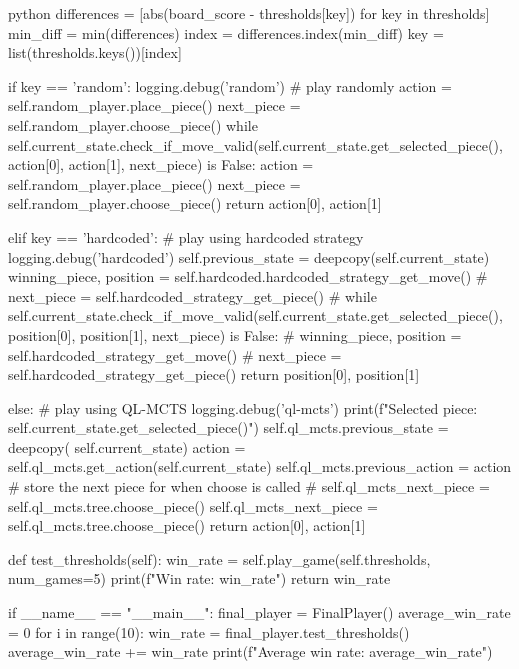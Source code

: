 \begin{mintedbox}{python}
            differences = [abs(board_score - thresholds[key])
                            for key in thresholds]
            min_diff = min(differences)
            index = differences.index(min_diff)
            key = list(thresholds.keys())[index]

            if key == 'random':
                logging.debug('random')
                # play randomly
                action = self.random_player.place_piece()
                next_piece = self.random_player.choose_piece()
                while self.current_state.check_if_move_valid(self.current_state.get_selected_piece(), action[0], action[1], next_piece) is False:
                    action = self.random_player.place_piece()
                    next_piece = self.random_player.choose_piece()
                return action[0], action[1]

            elif key == 'hardcoded':
                # play using hardcoded strategy
                logging.debug('hardcoded')
                self.previous_state = deepcopy(self.current_state)
                winning_piece, position = self.hardcoded.hardcoded_strategy_get_move()
                # next_piece = self.hardcoded_strategy_get_piece()
                # while self.current_state.check_if_move_valid(self.current_state.get_selected_piece(), position[0], position[1], next_piece) is False:
                #     winning_piece, position = self.hardcoded_strategy_get_move()
                #     next_piece = self.hardcoded_strategy_get_piece()
                return position[0], position[1]

            else:
                # play using QL-MCTS
                logging.debug('ql-mcts')
                print(f"Selected piece: {self.current_state.get_selected_piece()}")
                self.ql_mcts.previous_state = deepcopy(
                    self.current_state)
                action = self.ql_mcts.get_action(self.current_state)
                self.ql_mcts.previous_action = action
                # store the next piece for when choose is called
                # self.ql_mcts_next_piece = self.ql_mcts.tree.choose_piece()
                self.ql_mcts_next_piece = self.ql_mcts.tree.choose_piece()
                return action[0], action[1]

    def test_thresholds(self):
        win_rate = self.play_game(self.thresholds, num_games=5)
        print(f"Win rate: {win_rate}")
        return win_rate

if __name__ == "__main__":
    final_player = FinalPlayer()
    average_win_rate = 0
    for i in range(10):
        win_rate = final_player.test_thresholds()
        average_win_rate += win_rate
    print(f"Average win rate: {average_win_rate}")
\end{mintedbox}

